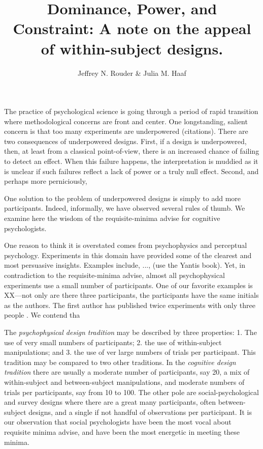 \documentclass[fignum,nobf,man]{apa}
\author{Jeffrey N. Rouder \& Julia M. Haaf}
\title{Dominance, Power, and Constraint: A note on the appeal of within-subject designs.}
\affiliation{University of Missouri}
\begin{document}
\maketitle




The practice of psychological science is going through a period of rapid transition where methodological concerns are front and center.  One longstanding, salient concern is that too many experiments are underpowered (citations).   There are two consequences of underpowered designs.  First, if a design is underpowered, then, at least from a classical point-of-view, there is an increased chance of failing to detect an effect.  When this failure happens, the interpretation is muddied as it is unclear if such failures reflect a lack of power or a truly null effect.  Second, and perhaps more perniciously, 

One solution to the problem of underpowered designs is simply to add more participants.  Indeed, informally, we have observed several rules of thumb.    We examine here the wisdom of the requisite-minima advise for cognitive psychologists.  


One reason to think it is overstated comes from psychophysics and perceptual psychology.  Experiments in this domain have provided some of the clearest and most persuasive insights.  Examples include, ..., (use the Yantis book).  Yet, in contradiction to the requisite-minima advise, almost all psychophysical experiments use a small number of participants.  One of our favorite examples is XX---not only are there three participants, the participants have the same initials as the authors.  The first author has published twice experiments with only three people \citep{Ratcliff:Rouder:1998,Rouder:etal:2005}.  We contend tha

The {\em psychophysical design tradition} may be described by three properties:  1. The use of very small numbers of participants; 2. the use of within-subject manipulations; and 3. the use of ver large numbers of trials per participant.  This tradition may be compared to two other traditions.  In the {\em cognitive design tradition} there are usually a moderate number of participants, say 20, a mix of within-subject and between-subject manipulations, and moderate numbers of trials per participants, say from 10 to 100.  The other pole are social-psychological and survey designs where there are a great many participants, often between-subject designs, and a single if not handful of observations per participant.  It is our observation that social psychologists have been the most vocal about requisite minima advise, and have been the most energetic in meeting these minima. 
\end{document}
